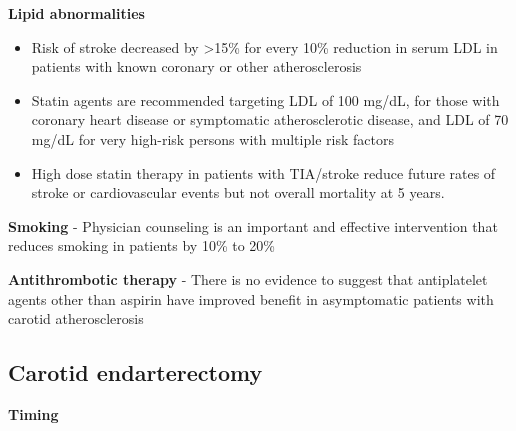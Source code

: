 \documentclass[
]{book}
\begin{document}
\textbf{Lipid abnormalities}

\begin{itemize}
\item
  Risk of stroke decreased by \textgreater15\% for every 10\% reduction in serum
  LDL in patients with known coronary or other atherosclerosis
\item
  Statin agents are recommended targeting LDL of 100 mg/dL, for those
  with coronary heart disease or symptomatic atherosclerotic disease,
  and LDL of 70 mg/dL for very high-risk persons with multiple risk
  factors
\item
  High dose statin therapy in patients with TIA/stroke reduce future
  rates of stroke or cardiovascular events but not overall mortality
  at 5 years. \citep{karamHighDoseAtorvastatinStroke2008}
\end{itemize}

\textbf{Smoking} - Physician counseling is an important and effective
intervention that reduces smoking in patients by 10\% to 20\%

\textbf{Antithrombotic therapy} - There is no evidence to suggest that
antiplatelet agents other than aspirin have improved benefit in
asymptomatic patients with carotid atherosclerosis

\hypertarget{carotid-endarterectomy}{%
\subsection{\texorpdfstring{\textbf{Carotid endarterectomy}}{Carotid endarterectomy}}\label{carotid-endarterectomy}}

\textbf{Timing}
\end{document}
